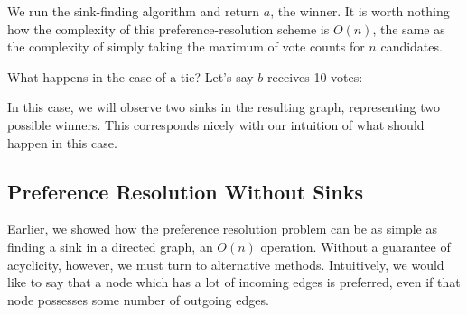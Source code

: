 \documentclass[12pt]{book}
\begin{document}
\begin{center}
\end{center}

We run the sink-finding algorithm and return $a$, the winner.
It is worth nothing how the complexity of this preference-resolution scheme is $O(n)$, the same as the complexity of simply taking the maximum of vote counts for $n$ candidates.

What happens in the case of a tie?
Let's say $b$ receives 10 votes:

\begin{center}
\end{center}

\begin{center}
\end{center}

In this case, we will observe two sinks in the resulting graph, representing two possible winners.
This corresponds nicely with our intuition of what should happen in this case.

\subsection{Preference Resolution Without Sinks}

Earlier, we showed how the preference resolution problem can be as simple as finding a sink in a directed graph, an $O(n)$ operation.
Without a guarantee of acyclicity, however, we must turn to alternative methods.
Intuitively, we would like to say that a node which has a lot of incoming edges is preferred, even if that node possesses some number of outgoing edges.
\end{document}
